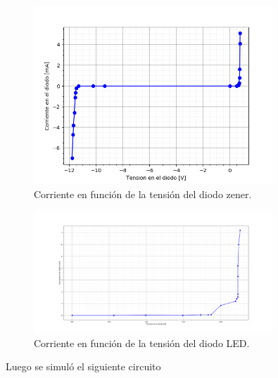\documentclass[a4paper]{article}
\begin{document}
\begin{figure}[H]
	\centering
	\includegraphics[width=0.8\textwidth]{CurvaZenerEntera.png}
	\caption{Corriente en función de la tensión del diodo zener.}
	\label{fig:diodozen}
\end{figure}

\begin{figure}[H]
	\centering
	\includegraphics[width=0.8\textwidth]{CurvaDiodosLed.png}
	\caption{Corriente en función de la tensión del diodo LED.}
	\label{fig:diodoled}
\end{figure}



Luego se simuló el siguiente circuito
%	
%
%
%
%	
%	
\end{document}
